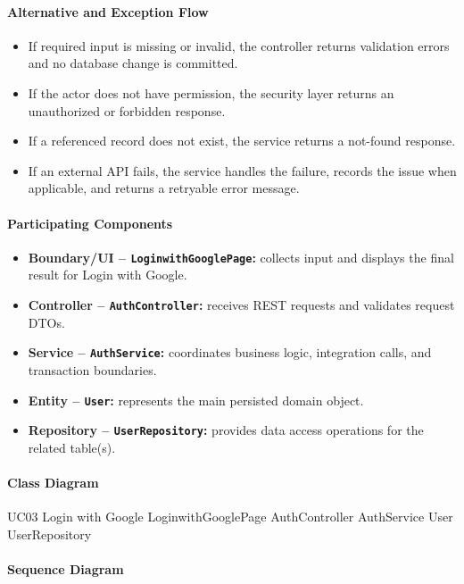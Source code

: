 \paragraph{Alternative and Exception Flow}

\begin{itemize}
    \item If required input is missing or invalid, the controller returns validation errors and no database change is committed.
    \item If the actor does not have permission, the security layer returns an unauthorized or forbidden response.
    \item If a referenced record does not exist, the service returns a not-found response.
    \item If an external API fails, the service handles the failure, records the issue when applicable, and returns a retryable error message.
\end{itemize}

\paragraph{Participating Components}

\begin{itemize}
    \item \textbf{Boundary/UI -- \texttt{LoginwithGooglePage}:} collects input and displays the final result for Login with Google.
    \item \textbf{Controller -- \texttt{AuthController}:} receives REST requests and validates request DTOs.
    \item \textbf{Service -- \texttt{AuthService}:} coordinates business logic, integration calls, and transaction boundaries.
    \item \textbf{Entity -- \texttt{User}:} represents the main persisted domain object.
    \item \textbf{Repository -- \texttt{UserRepository}:} provides data access operations for the related table(s).
\end{itemize}

\paragraph{Class Diagram}

\ClassDiagram
{UC03 Login with Google}
{LoginwithGooglePage}
{AuthController}
{AuthService}
{User}
{UserRepository}

\paragraph{Sequence Diagram}

